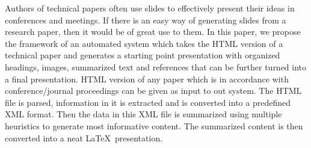 Authors of technical papers often use slides to effectively present their ideas in
conferences and meetings. If there is an easy way of generating slides from a
research paper, then it would be of great use to them. In this paper, we propose the
framework of an automated system which takes the HTML version of a technical paper and generates a starting point presentation with organized headings, images, summarized
text and references that can be further turned into a final presentation. HTML version
of any paper which is in accordance with conference/journal proceedings can be given
as input to out system. The HTML file is parsed, information in it is extracted and is
converted into a predefined XML format. Then the data in this XML file is summarized
using multiple heuristics to generate most informative content. The summarized content
is then converted into a neat \LaTeX\ presentation.